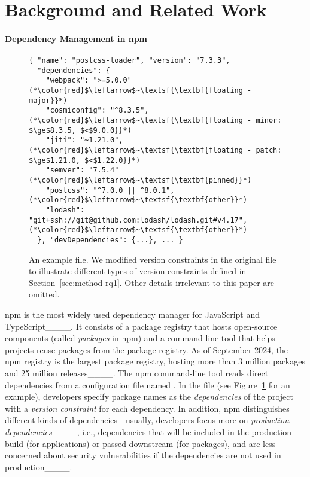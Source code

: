 \section{Background and Related Work}
\label{sec:background}

\paragraph{Dependency Management in npm}

\begin{figure}[b]
    \scriptsize
    \centering
\begin{lstlisting}[style=json,numbers=none]
{ "name": "postcss-loader", "version": "7.3.3",
  "dependencies": {
    "webpack": ">=5.0.0"     (*\color{red}$\leftarrow$~\textsf{\textbf{floating - major}}*)
    "cosmiconfig": "^8.3.5", (*\color{red}$\leftarrow$~\textsf{\textbf{floating - minor: $\ge$8.3.5, $<$9.0.0}}*)
    "jiti": "~1.21.0",       (*\color{red}$\leftarrow$~\textsf{\textbf{floating - patch: $\ge$1.21.0, $<$1.22.0}}*)
    "semver": "7.5.4"        (*\color{red}$\leftarrow$~\textsf{\textbf{pinned}}*)
    "postcss": "^7.0.0 || ^8.0.1", (*\color{red}$\leftarrow$~\textsf{\textbf{other}}*)
    "lodash": "git+ssh://git@github.com:lodash/lodash.git#v4.17", (*\color{red}$\leftarrow$~\textsf{\textbf{other}}*)
  }, "devDependencies": {...}, ... }
\end{lstlisting}
\caption{
An example  file. 
We modified version constraints in the original file to illustrate different types of version constraints defined in Section~\ref{sec:method-rq1}. Other details irrelevant to this paper are omitted.}
\label{fig:example-pkgjson}
\end{figure}

npm is the most widely used dependency manager for  JavaScript and TypeScript____.
It consists of a package registry that hosts open-source components (called \emph{packages} in npm) and a command-line tool that helps projects reuse packages from the package registry.  
As of September 2024, the npm registry is the largest package registry, hosting more than 3 million packages and 25 million releases____.
The npm command-line tool reads direct dependencies from a configuration file named .
In the  file (see Figure~\ref{fig:example-pkgjson} for an example), developers specify package names as the \emph{dependencies} of the project with a \emph{version constraint} for each dependency.
In addition, npm distinguishes different kinds of dependencies---usually, developers focus more on \emph{production dependencies}____, i.e., dependencies that will be included in the production build (for applications) or passed downstream (for packages), and are less concerned about security vulnerabilities if the dependencies are not used in production____.

